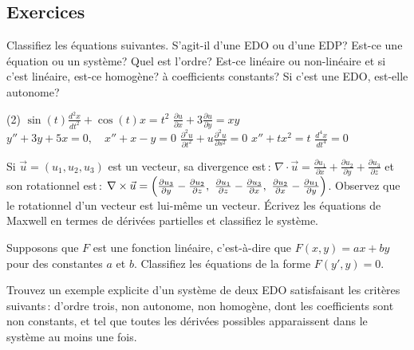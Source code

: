 \subsection{Exercices}

\begin{exercise}
Classifiez les \'equations suivantes. S'agit-il d'une EDO ou d'une EDP?  Est-ce une \'equation ou un syst\`eme?  Quel est l'ordre?  Est-ce lin\'eaire ou non-lin\'eaire et si c'est lin\'eaire, est-ce homog\`ene? \`a coefficients constants?  Si c'est une EDO, est-elle autonome?

\begin{tasks}(2)
\task $\displaystyle \sin(t) \frac{d^2 x}{dt^2} + \cos(t) x = t^2$
\task $\displaystyle \frac{\partial u}{\partial x} + 3 \frac{\partial u}{\partial y} = xy$
\task $\displaystyle y''+3y+5x=0, \quad x''+x-y=0$
\task $\displaystyle \frac{\partial^2 u}{\partial t^2} + u\frac{\partial^2 u}{\partial s^2} =
0$
\task $\displaystyle x''+tx^2=t$
\task $\displaystyle \frac{d^4 x}{dt^4} = 0$
\end{tasks}
\end{exercise}

\begin{exercise}
Si $\vec{u} = (u_1,u_2,u_3)$ est un vecteur, sa divergence est\,:
$\nabla \cdot \vec{u} =
\frac{\partial u_1}{\partial x} +
\frac{\partial u_2}{\partial y} +
\frac{\partial u_3}{\partial z}$ et son rotationnel est\,: 
$\nabla \times \vec{u} =
\Bigl(
\frac{\partial u_3}{\partial y} - \frac{\partial u_2}{\partial z} , ~
\frac{\partial u_1}{\partial z} - \frac{\partial u_3}{\partial x} , ~
\frac{\partial u_2}{\partial x} - \frac{\partial u_1}{\partial y} \Bigr)$.
Observez que le rotationnel d'un vecteur est lui-m\^eme un vecteur.  \'Ecrivez les \'equations de Maxwell en termes de d\'eriv\'ees partielles et classifiez le syst\`eme.
\end{exercise}

\begin{exercise}
Supposons que $F$ est une fonction lin\'eaire, c'est-\`a-dire que $F(x,y) = ax+by$ pour des constantes $a$ et $b$.  Classifiez les \'equations de la forme $F(y',y) = 0$.
\end{exercise}

\begin{exercise}
Trouvez un exemple explicite d'un syst\`eme de deux EDO satisfaisant les crit\`eres suivants\,: d'ordre trois,
non autonome, non homog\`ene, dont les coefficients sont non constants, et tel que toutes les d\'eriv\'ees possibles apparaissent dans le syst\`eme au moins une fois.
\end{exercise}

